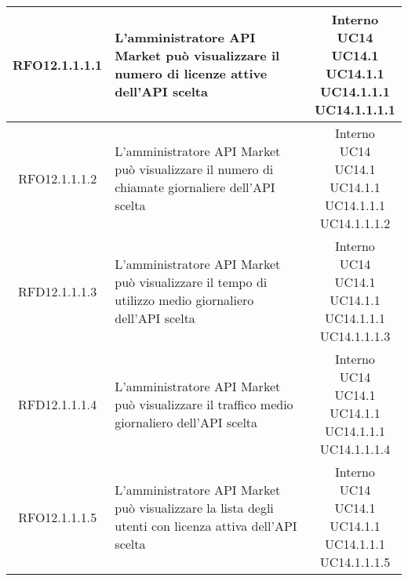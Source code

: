 \begin{longtable}{|c|p{8cm}|c|}
\hypertarget{RFO12.1.1.1.1}{RFO12.1.1.1.1} & L'amministratore API Market può visualizzare il numero di licenze attive dell'API scelta & \makecell*{Interno\\UC14\\UC14.1\\UC14.1.1\\UC14.1.1.1\\UC14.1.1.1.1} \\
\hline
\hypertarget{RFO12.1.1.1.2}{RFO12.1.1.1.2} & L'amministratore API Market può visualizzare il numero di chiamate giornaliere dell'API scelta & \makecell*{Interno\\UC14\\UC14.1\\UC14.1.1\\UC14.1.1.1\\UC14.1.1.1.2} \\
\hline
\hypertarget{RFD12.1.1.1.3}{RFD12.1.1.1.3} & L'amministratore API Market può visualizzare il tempo di utilizzo medio giornaliero dell'API scelta & \makecell*{Interno\\UC14\\UC14.1\\UC14.1.1\\UC14.1.1.1\\UC14.1.1.1.3} \\
\hline
\hypertarget{RFD12.1.1.1.4}{RFD12.1.1.1.4} & L'amministratore API Market può visualizzare il traffico medio giornaliero dell'API scelta & \makecell*{Interno\\UC14\\UC14.1\\UC14.1.1\\UC14.1.1.1\\UC14.1.1.1.4} \\
\hline

\hypertarget{RFO12.1.1.1.5}{RFO12.1.1.1.5} & L'amministratore API Market può visualizzare la lista degli utenti con licenza attiva dell'API scelta & \makecell*{Interno\\UC14\\UC14.1\\UC14.1.1\\UC14.1.1.1\\UC14.1.1.1.5} \\
\hline


\end{longtable}
